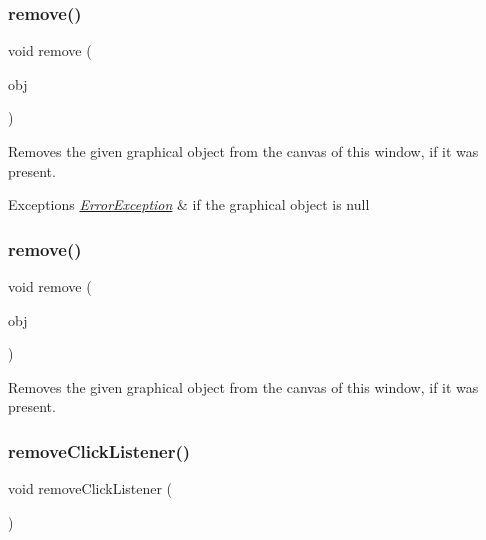 \subsubsection{\texorpdfstring{remove()}{remove()}\hspace{0.1cm}{\footnotesize\ttfamily [3/4]}}
{\footnotesize\ttfamily void remove (\begin{DoxyParamCaption}\item[{\mbox{\hyperlink{classGObject}{G\+Object}} $\ast$}]{obj }\end{DoxyParamCaption})\hspace{0.3cm}{\ttfamily [virtual]}}



Removes the given graphical object from the canvas of this window, if it was present. 


\begin{DoxyExceptions}{Exceptions}
{\em \mbox{\hyperlink{classErrorException}{Error\+Exception}}} & if the graphical object is null \\
\hline
\end{DoxyExceptions}
\mbox{\label{classGWindow_a37cf4a26853ac22c5e3a21335dfc7ac9}} 
\subsubsection{\texorpdfstring{remove()}{remove()}\hspace{0.1cm}{\footnotesize\ttfamily [4/4]}}
{\footnotesize\ttfamily void remove (\begin{DoxyParamCaption}\item[{\mbox{\hyperlink{classGObject}{G\+Object}} \&}]{obj }\end{DoxyParamCaption})\hspace{0.3cm}{\ttfamily [virtual]}}



Removes the given graphical object from the canvas of this window, if it was present. 

\mbox{\label{classGWindow_ad39d0325cde6b97ebda4b9d7787c633b}} 
\subsubsection{\texorpdfstring{remove\+Click\+Listener()}{removeClickListener()}}
{\footnotesize\ttfamily void remove\+Click\+Listener (\begin{DoxyParamCaption}{ }\end{DoxyParamCaption})\hspace{0.3cm}{\ttfamily [virtual]}}



